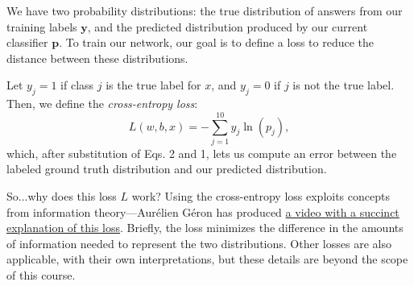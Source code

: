 We have two probability distributions: the true distribution of answers from our training labels $\mathbf{y}$, and the predicted distribution produced by our current classifier $\mathbf{p}$. To train our network, our goal is to define a loss to reduce the distance between these distributions.

Let $y_j=1$ if class $j$ is the true label for $x$, and $y_j = 0$ if $j$ is not the true label. Then, we define the \emph{cross-entropy loss}:
\begin{equation}
    L(w,b,x) = - \sum_{j=1}^{10}y_j\ln(p_j),
\end{equation}
which, after substitution of Eqs. 2 and 1, lets us compute an error between the labeled ground truth distribution and our predicted distribution.

So...why does this loss $L$ work? Using the cross-entropy loss exploits concepts from information theory---Aur\'{e}lien G\'{e}ron has produced \href{https://www.youtube.com/watch?v=ErfnhcEV1O8}{a video with a succinct explanation of this loss}. Briefly, the loss minimizes the difference in the amounts of information needed to represent the two distributions. Other losses are also applicable, with their own interpretations, but these details are beyond the scope of this course.

%
%
%
%
%
%

